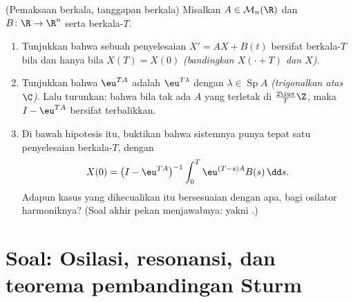 \begin{exercise}[$\star\star\star$]\label{exo:b2:diffeq:12}
(Pemaksaan berkala, tanggapan berkala) Misalkan $A \in
\mathcal{M}_n(\R)$ dan $B \colon \R \to \R^n$  serta
berkala-$T$.
\begin{enumerate}
  \item Tunjukkan bahwa sebuah penyelesaian $X' = AX + B(t)$ bersifat
        berkala-$T$ bila dan hanya bila $X(T) = X(0)$
        \emph{(bandingkan $X(\cdot + T)$ dan $X$)}.
  \item Tunjukkan bahwa  $\eu^{TA}$ adalah
        $\eu^{T\lambda}$ dengan $\lambda \in \operatorname{Sp}A$
        \emph{(trigonalkan atas $\C$)}. Lalu turunkan: bahwa bila tak ada
         $A$ yang terletak di $\frac{2\iu\pi}{T}\Z$, maka
        $I - \eu^{TA}$ bersifat terbalikkan.
  \item Di bawah hipotesis itu, buktikan bahwa sistemnya punya
        tepat satu penyelesaian berkala-$T$, dengan
        \[
        X(0) = \bigl(I - \eu^{TA}\bigr)^{-1}
        \int_0^{T}\eu^{(T-s)A}B(s)\,\dd s .
        \]
        Adapun kasus yang dikecualikan itu bersesuaian dengan apa, bagi
        osilator harmoniknya? (Soal akhir pekan menjawabnya:
        yakni .)
\end{enumerate}
\end{exercise}

\section{Soal: Osilasi, resonansi, dan teorema pembandingan
Sturm}

